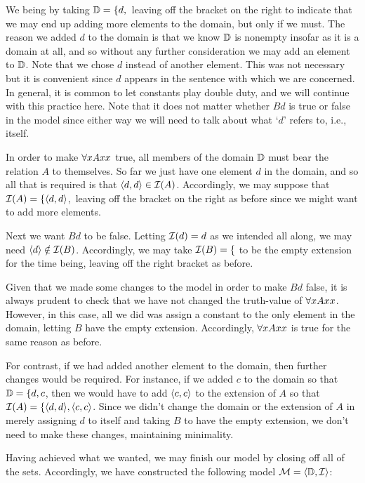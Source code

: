 We being by taking $\mathbb{D}=\{d,$\ leaving off the bracket on the right to indicate that we may end up adding more elements to the domain, but only if we must.
The reason we added $d$ to the domain is that we know $\mathbb{D}$ is nonempty insofar as it is a domain at all, and so without any further consideration we may add an element to $\mathbb{D}$.
Note that we chose $d$ instead of another element. 
This was not necessary but it is convenient since $d$ appears in the sentence with which we are concerned.
In general, it is common to let constants play double duty, and we will continue with this practice here. 
Note that it does not matter whether $Bd$ is true or false in the model since either way we will need to talk about what `$d$' refers to, i.e., itself. 

In order to make $\forall x Axx$ true, all members of the domain $\mathbb{D}$ must bear the relation $A$ to themselves.
So far we just have one element $d$ in the domain, and so all that is required is that $\langle d,d\rangle\in\mathcal{I}(A)$.
Accordingly, we may suppose that $\mathcal{I}(A)=\{\langle d,d\rangle$,\ leaving off the bracket on the right as before since we might want to add more elements.

Next we want $Bd$ to be false.
Letting $\mathcal{I}(d)=d$ as we intended all along, we may need $\langle d\rangle\notin\mathcal{I}(B)$.
Accordingly, we may take $\mathcal{I}(B)=\{$ to be the empty extension for the time being, leaving off the right bracket as before.

Given that we made some changes to the model in order to make $Bd$ false, it is always prudent to check that we have not changed the truth-value of $\forall x Axx$. 
However, in this case, all we did was assign a constant to the only element in the domain, letting $B$ have the empty extension.
Accordingly, $\forall x Axx$ is true for the same reason as before.  

For contrast, if we had added another element to the domain, then further changes would be required.
For instance, if we added $c$ to the domain so that $\mathbb{D}=\{d,c$, then we would have to add $\langle c,c\rangle$ to the extension of $A$ so that $\mathcal{I}(A)=\{\langle d,d\rangle,\langle c,c\rangle$.
Since we didn't change the domain or the extension of $A$ in merely assigning $d$ to itself and taking $B$ to have the empty extension, we don't need to make these changes, maintaining minimality.

Having achieved what we wanted, we may finish our model by closing off all of the sets.
Accordingly, we have constructed the following model $\mathcal{M}=\langle\mathbb{D},\mathcal{I}\rangle$:

